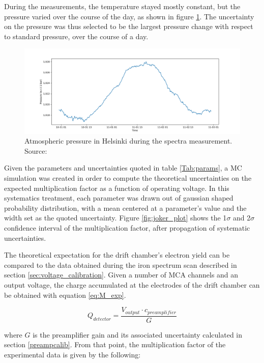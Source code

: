 During the measurements, the temperature stayed mostly constant, but the pressure varied over the course of the day, as shown in figure \ref{fig:pressure}. The uncertainty on the pressure was thus selected to be the largest pressure change with respect to standard pressure, over the course of a day.

\begin{figure}[htb]
  \includegraphics[width=\textwidth]{graphics/pressure_monitoring.png}
  \caption{Atmospheric pressure in Helsinki during the spectra measurement. Source: \cite{meteo}}
  \label{fig:pressure}
\end{figure}

Given the parameters and uncertainties quoted in table \ref{Tab:params}, a MC simulation was created in order to compute the theoretical uncertainties on the expected multiplication factor as a function of operating voltage. In this systematics treatment, each parameter was drawn out of gaussian shaped probability distribution, with a mean centered at a parameter's value and the width set as the quoted uncertainty. Figure \ref{fig:joker_plot} shows the 1$\sigma$ and 2$\sigma$ confidence interval of the multiplication factor, after propagation of systematic uncertainties.

The theoretical expectation for the drift chamber's electron yield can be compared to the data obtained during the iron spectrum scan described in section \ref{sec:voltage_calibration}. Given a number of MCA channels and an output voltage, the charge accumulated at the electrodes of the drift chamber can be obtained with equation \ref{eq:M_exp}.

\begin{equation}
  \label{eq:M_exp}
  Q_{detector} = \frac{V_{output}\cdot c_{preamplifier}}{G}
\end{equation}

where $G$ is the preamplifier gain and its associated uncertainty calculated in section \ref{preampcalib}. From that point, the multiplication factor of the experimental data is given by the following:

